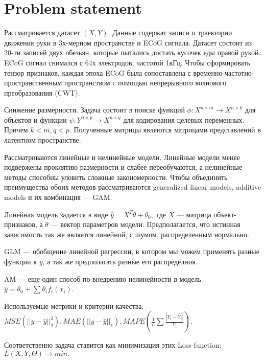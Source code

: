 \documentclass{article}
\begin{document}
\section{Problem statement}
Рассматривается датасет $(X, Y).$ Данные содержат записи о траектории движения руки в 3х-мерном пространстве и ECoG сигнала. Датасет состоит из 20-ти записей двух обезьян, которые пытались достать кусочек еды правой рукой. ECoG сигнал снимался с 64х электродов, частотой 1кГц. Чтобы сформировать тензор признаков, каждая эпоха ECoG была сопоставлена с временно-частотно-пространственным пространством с помощью непрерывного волнового преобразования (CWT). \par
Снижение размерности. Задача состоит в поиске функций $\phi: X^{n\times m} \rightarrow X^{n\times k}$ для объектов и функции  $\psi: Y^{n\times p} \rightarrow X^{n\times q}$ для кодирования целевых переменных. Причем $k < m, q < p.$ Полученные матрицы являются матрицами представлений в латентном пространстве.
\par
Рассматриваются линейные и нелинейные модели. Линейные модели менее подвержены проклятию размерности и слабее переобучаются, а нелинейные методы способны уловить сложные закономерности. Чтобы объединить преимущества обоих методов рассматриваются generalized linear models, additive models и их комбинация --- GAM. \par
Линейная модель задается в виде $\hat y = X^T\theta + \theta_0,$ где $X$ --- матрица объект-признаков, а $\theta$ --- вектор параметров модели. Предполагается, что истинная зависимость так же является линейной, с шумом, распределенным нормально. \par
GLM --- обобщение линейной регрессии, в котором мы можем применять разные функции к $y$, а так же предполагать разные его распределния. \par
AM --- еще один способ по внедрению нелинейности в модель. $\hat y = \theta_0 + \sum \theta_i f_i(x_i)$. \par
Используемые метрики и критерии качества: $MSE(||y-\hat y||_2^2 ), MAE(||y-\hat y||_1), MAPE(\frac{1}{n}\sum \frac{|Y_i-\hat Y_i|}{Y_i})$.  \par
Соответственно задача ставится как минимизация этих Loss-function: $L(X, Y, \Theta) \rightarrow min.$
\end{document}
